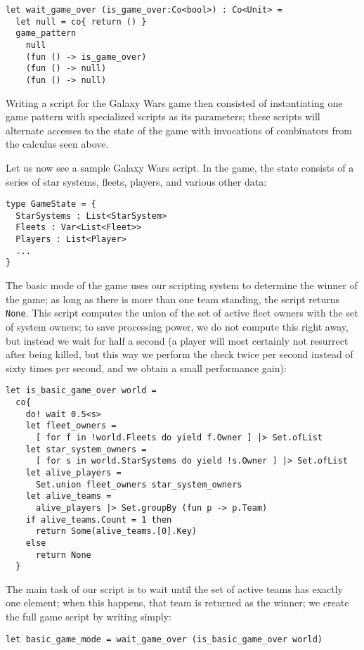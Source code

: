 \begin{lstlisting}
let wait_game_over (is_game_over:Co<bool>) : Co<Unit> =
  let null = co{ return () }
  game_pattern
    null
    (fun () -> is_game_over)
    (fun () -> null)
    (fun () -> null)
\end{lstlisting}

Writing a script for the Galaxy Wars game then consisted of instantiating one game pattern with specialized scripts as its parameters; these scripts will alternate accesses to the state of the game with invocations of combinators from the calculus seen above.  

Let us now see a sample Galaxy Wars script. In the game, the state consists of a series of star systems, fleets, players, and various other data:

\begin{lstlisting}
type GameState = {
  StarSystems : List<StarSystem>
  Fleets : Var<List<Fleet>>
  Players : List<Player>
  ... 
}
\end{lstlisting}

The basic mode of the game uses our scripting system to determine the winner of the game; as long as there is more than one team standing, the script returns \texttt{None}. This script computes the union of the set of active fleet owners with the set of system owners; to save processing power, we do not compute this right away, but instead we wait for half a second (a player will most certainly not resurrect after being killed, but this way we perform the check twice per second instead of sixty times per second, and we obtain a small performance gain):

\begin{lstlisting}
let is_basic_game_over world =
  co{
    do! wait 0.5<s>
    let fleet_owners = 
      [ for f in !world.Fleets do yield f.Owner ] |> Set.ofList
    let star_system_owners = 
      [ for s in world.StarSystems do yield !s.Owner ] |> Set.ofList
    let alive_players =  
      Set.union fleet_owners star_system_owners
    let alive_teams =  
      alive_players |> Set.groupBy (fun p -> p.Team)
    if alive_teams.Count = 1 then 
      return Some(alive_teams.[0].Key)
    else 
      return None
  }
\end{lstlisting}

The main task of our script is to wait until the set of active teams has exactly one element; when this happens, that team is returned as the winner; we create the full game script by writing simply: 

\begin{lstlisting}
let basic_game_mode = wait_game_over (is_basic_game_over world)
\end{lstlisting}

